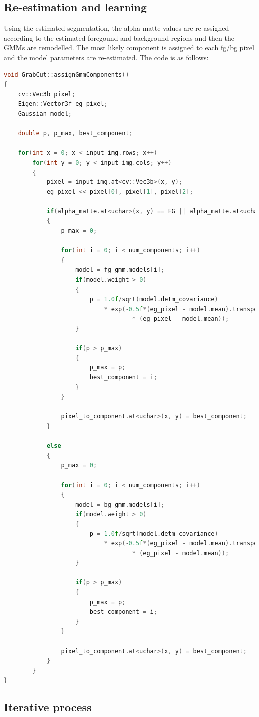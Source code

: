 \documentclass[a4paper,11]{article}
\begin{document}
  \subsection{Re-estimation and learning}
  
 Using the estimated segmentation, the alpha matte values are re-assigned according to the estimated foregound and background regions and then the GMMs are remodelled. The most likely component is assigned to each fg/bg pixel and the model parameters are re-estimated. The code is as follows:
    \begin{lstlisting}[language=C++]
void GrabCut::assignGmmComponents()
{
	cv::Vec3b pixel;
	Eigen::Vector3f eg_pixel;
	Gaussian model;

	double p, p_max, best_component;

	for(int x = 0; x < input_img.rows; x++)
		for(int y = 0; y < input_img.cols; y++)
		{
			pixel = input_img.at<cv::Vec3b>(x, y);
			eg_pixel << pixel[0], pixel[1], pixel[2];

			if(alpha_matte.at<uchar>(x, y) == FG || alpha_matte.at<uchar>(x, y) == PFG)
			{
				p_max = 0;

				for(int i = 0; i < num_components; i++)
				{
					model = fg_gmm.models[i];
					if(model.weight > 0)
					{
						p = 1.0f/sqrt(model.detm_covariance)
							* exp(-0.5f*(eg_pixel - model.mean).transpose() * model.inverse_covariance
									* (eg_pixel - model.mean));
					}

					if(p > p_max)
					{
						p_max = p;
						best_component = i;
					}
				}

				pixel_to_component.at<uchar>(x, y) = best_component;
			}

			else
			{
				p_max = 0;

				for(int i = 0; i < num_components; i++)
				{
					model = bg_gmm.models[i];
					if(model.weight > 0)
					{
						p = 1.0f/sqrt(model.detm_covariance)
							* exp(-0.5f*(eg_pixel - model.mean).transpose() * model.inverse_covariance
									* (eg_pixel - model.mean));
					}

					if(p > p_max)
					{
						p_max = p;
						best_component = i;
					}
				}

				pixel_to_component.at<uchar>(x, y) = best_component;
			}
		}
}

    \end{lstlisting}
    \vspace{1em}
    
  \subsection{Iterative process}
  
\end{document}
